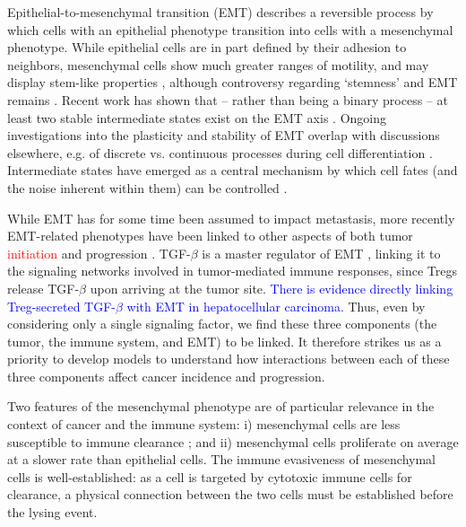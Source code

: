 \documentclass[11pt]{article}
\newcommand{\tcr} { \textcolor{red} }
\newcommand{\tcb} { \textcolor{blue} }
\begin{document}
\par
Epithelial-to-mesenchymal transition (EMT) describes a reversible process by which cells with an epithelial phenotype transition into cells with a mesenchymal phenotype.
While epithelial cells are in part defined by their adhesion to neighbors, mesenchymal cells show much greater ranges of motility, and may display stem-like properties \cite{nieto2016emt}, although controversy regarding `stemness' and EMT remains \cite{nie18_stem, sha19_intermediate}.  
Recent work has shown that -- rather than being a binary process -- at least two stable intermediate states exist on the EMT axis \cite{hong2015ovol2, jolly15_coupling}.
Ongoing investigations into the plasticity and stability of EMT overlap with discussions elsewhere, e.g. of discrete vs. continuous processes during cell differentiation \cite{moris16_transition}.
Intermediate states have emerged as a central mechanism by which cell fates (and the noise inherent within them) can be controlled \cite{maclean18_exploring, ta16_controlling, rackauckas18_meanindependent}. 
\par 
While EMT has for some time been assumed to impact metastasis, more recently EMT-related phenotypes have been linked to other aspects of both tumor \tcr{initiation} \tcb{\cite{puisieux2014oncogenic}} and progression \cite{nieto2016emt}\tcb{\cite{peinado2007snail}}.
TGF-$\beta$ is a master regulator of EMT \cite{lim2012epithelial}, linking it to the signaling networks involved in tumor-mediated immune responses, since Tregs release TGF-$\beta$ upon arriving at the tumor site\cite{terry2017new}. 
\tcb{There is evidence directly linking Treg-secreted TGF-$\beta$ with EMT in hepatocellular carcinoma\cite{shi2019cd4+}.} Thus, even by considering only a single signaling factor, we find these three components (the tumor, the immune system, and EMT) to be linked. It therefore strikes us as a priority to develop models to understand how interactions between each of these three components affect cancer incidence and progression.
\par
Two features of the mesenchymal phenotype are of particular relevance in the context of cancer and the immune system: i) mesenchymal cells are less susceptible to immune clearance \cite{terry2017new}; and ii) mesenchymal cells proliferate on average at a slower rate than epithelial cells.
The immune evasiveness of mesenchymal cells is well-established: as a cell is targeted by cytotoxic immune cells for clearance, a physical connection between the two cells must be established before the lysing event.
\end{document}
